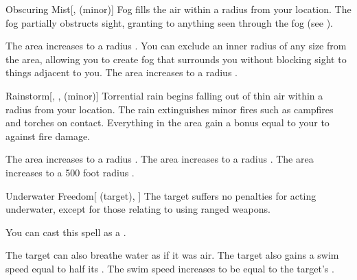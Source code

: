\lowercase{\hypertarget{spell:Obscuring Mist}{}}\label{spell:Obscuring Mist}
\begin{freeability}[Rank 2]{\hypertarget{spell:Obscuring Mist}{Obscuring Mist}}[,  (minor)]
\targetrule
Fog fills the air within a \areamed radius  from your location.
The fog partially obstructs sight, granting  to anything seen through the fog (see ).

\rankline
{} The area increases to a \arealarge radius .
 You can exclude an inner radius of any size from the area, allowing you to create fog that surrounds you without blocking sight to things adjacent to you.
 The area increases to a \areahuge radius .
\end{freeability}
\vspace{0.25em}



\lowercase{\hypertarget{spell:Rainstorm}{}}\label{spell:Rainstorm}
\begin{freeability}[Rank 2]{\hypertarget{spell:Rainstorm}{Rainstorm}}[, ,  (minor)]
Torrential rain begins falling out of thin air within a \arealarge radius  from your location.
The rain extinguishes minor fires such as campfires and torches on contact.
Everything in the area gain a bonus equal to your  to  against fire damage.

\rankline
{} The area increases to a \areahuge radius .
 The area increases to a \areaext radius .
 The area increases to a 500 foot radius .
\end{freeability}
\vspace{0.25em}



\lowercase{\hypertarget{spell:Underwater Freedom}{}}\label{spell:Underwater Freedom}
\begin{attuneability}[Rank 2]{\hypertarget{spell:Underwater Freedom}{Underwater Freedom}}[ (target), ]
The target suffers no penalties for acting underwater, except for those relating to using ranged weapons.

You can cast this spell as a .

\rankline
{} The target can also breathe water as if it was air.
 The target also gains a swim speed equal to half its .
 The swim speed increases to be equal to the target's .
\end{attuneability}
\vspace{0.25em}



